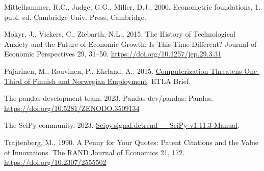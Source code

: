\documentclass[
  11,
  a4paperpaper,
]{article}
\newlength{\cslhangindent}
\newenvironment{CSLReferences}[2] %
 {\begin{list}{}{%
  \setlength{\itemindent}{0pt}
  \setlength{\leftmargin}{0pt}
  \setlength{\parsep}{0pt}
  \ifodd #1
   \setlength{\leftmargin}{\cslhangindent}
   \setlength{\itemindent}{-1\cslhangindent}
  \fi
  \setlength{\itemsep}{#2\baselineskip}}}
 {\end{list}}
\begin{document}
\begin{CSLReferences}{1}{0}
Mittelhammer, R.C., Judge, G.G., Miller, D.J., 2000. Econometric
foundations, 1. publ. ed. Cambridge Univ. Press, Cambridge.

Mokyr, J., Vickers, C., Ziebarth, N.L., 2015. The {History} of
{Technological} {Anxiety} and the {Future} of {Economic} {Growth}: {Is}
{This} {Time} {Different}? Journal of Economic Perspectives 29, 31--50.
\url{https://doi.org/10.1257/jep.29.3.31}

Pajarinen, M., Rouvinen, P., Ekeland, A., 2015.
\href{https://ideas.repec.org//p/rif/briefs/34.html}{Computerization
{Threatens} {One}-{Third} of {Finnish} and {Norwegian} {Employment}}.
ETLA Brief.

The pandas development team, 2023. Pandas-dev/pandas: {Pandas}.
\url{https://doi.org/10.5281/ZENODO.3509134}

The SciPy community, 2023.
\href{https://docs.scipy.org/doc/scipy/reference/generated/scipy.signal.detrend.html}{Scipy.signal.detrend
--- {SciPy} v1.11.3 {Manual}}.

Trajtenberg, M., 1990. A {Penny} for {Your} {Quotes}: {Patent}
{Citations} and the {Value} of {Innovations}. The RAND Journal of
Economics 21, 172. \url{https://doi.org/10.2307/2555502}


\end{CSLReferences}
\end{document}
